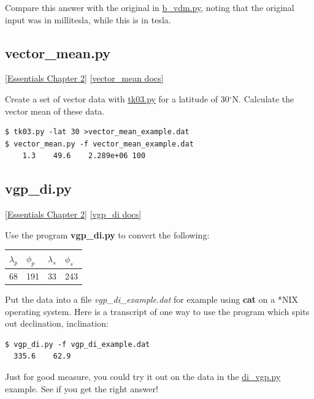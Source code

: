 \documentclass[11pt]{book}
\begin{document}
{{{Compare this answer with the original in \href{#b_vdm.py}{b\_vdm.py}, noting that the original input was in millitesla, while this is in tesla.




\subsection{vector\_mean.py}
\href{http://earthref.org/MAGIC/books/Tauxe/Essentials/WebBook3ch2.html#ch2}{[Essentials Chapter 2]}
\href{https://github.com/PmagPy/PmagPy/blob/master/programs/vector_mean.py}{[vector\_mean docs]}

Create a set of vector data with \href{#tk03.py}{tk03.py} for a latitude of 30$^{\circ}$N.  Calculate the vector mean of these data.

\begin{verbatim}
$ tk03.py -lat 30 >vector_mean_example.dat
$ vector_mean.py -f vector_mean_example.dat
    1.3    49.6    2.289e+06 100
\end{verbatim}


\subsection{vgp\_di.py}
\href{http://earthref.org/MAGIC/books/Tauxe/Essentials/WebBook3ch2.html#ch2}{[Essentials Chapter 2]}
\href{https://github.com/PmagPy/PmagPy/blob/master/programs/vgp_di.py}{[vgp\_di docs]}

Use the program {\bf vgp\_di.py} to convert the
following:


\begin{tabular}{llll}
\hline
$\lambda_p$\qquad &$\phi_p$ \qquad & $\lambda_s$\qquad & $\phi_s$ \\
\hline
68 \qquad & 191 \qquad & 33 \qquad & 243\\
\hline
\end{tabular}

 Put the data into a file {\it vgp\_di\_example.dat} for example using {\bf cat} on a *NIX operating system.
Here is a transcript of one way to use the program which spits out declination, inclination:

\begin{verbatim}
$ vgp_di.py -f vgp_di_example.dat
  335.6    62.9
\end{verbatim}

Just for good measure, you could try it out on the data in the \href{#di_vgp.py}{di\_vgp.py} example.  See if you get the right answer!

}}}
\end{document}
